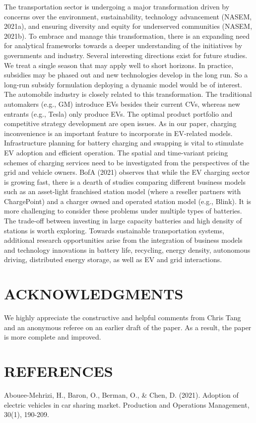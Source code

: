 \documentclass[10pt]{article}
\begin{document}
The transportation sector is undergoing a major transformation driven by concerns over the environment, sustainability, technology advancement (NASEM, 2021a), and ensuring diversity and equity for underserved communities (NASEM, 2021b). To embrace and manage this transformation, there is an expanding need for analytical frameworks towards a deeper understanding of the initiatives by governments and industry. Several interesting directions exist for future studies. We treat a single season that may apply well to short horizons. In practice, subsidies may be phased out and new technologies develop in the long run. So a long-run subsidy formulation deploying a dynamic model would be of interest. The automobile industry is closely related to this transformation. The traditional automakers (e.g., GM) introduce EVs besides their current CVs, whereas new entrants (e.g., Tesla) only produce EVs. The optimal product portfolio and competitive strategy development are open issues. As in our paper, charging inconvenience is an important feature to incorporate in EV-related models. Infrastructure planning for battery charging and swapping is vital to stimulate EV adoption and efficient operation. The spatial and time-variant pricing schemes of charging services need to be investigated from the perspectives of the grid and vehicle owners. BofA (2021) observes that while the EV charging sector is growing fast, there is a dearth of studies comparing different business models such as an asset-light franchised station model (where a reseller partners with ChargePoint) and a charger owned and operated station model (e.g., Blink). It is more challenging to consider these problems under multiple types of batteries. The trade-off between investing in large capacity batteries and high density of stations is worth exploring. Towards sustainable transportation systems, additional research opportunities arise from the integration of business models and technology innovations in battery life, recycling, energy density, autonomous driving, distributed energy storage, as well as EV and grid interactions.

\section*{ACKNOWLEDGMENTS}
We highly appreciate the constructive and helpful comments from Chris Tang and an anonymous referee on an earlier draft of the paper. As a result, the paper is more complete and improved.

\section*{REFERENCES}
Abouee-Mehrizi, H., Baron, O., Berman, O., \& Chen, D. (2021). Adoption of electric vehicles in car sharing market. Production and Operations Management, 30(1), 190-209.
\end{document}
